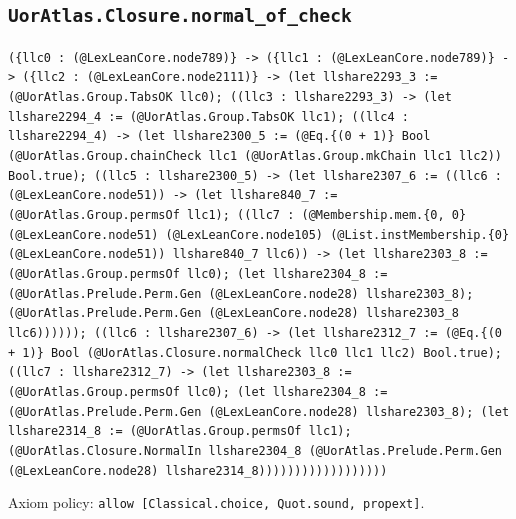 \documentclass[11pt]{article}
\begin{document}
\subsection*{\texttt{UorAtlas.Closure.normal\_of\_check}}
\noindent\texttt{(\{llc0 : (@LexLeanCore.node789)\} -> (\{llc1 : (@LexLeanCore.node789)\} -> (\{llc2 : (@LexLeanCore.node2111)\} -> (let llshare2293\_3 := (@UorAtlas.Group.TabsOK llc0); ((llc3 : llshare2293\_3) -> (let llshare2294\_4 := (@UorAtlas.Group.TabsOK llc1); ((llc4 : llshare2294\_4) -> (let llshare2300\_5 := (@Eq.\{(0 + 1)\} Bool (@UorAtlas.Group.chainCheck llc1 (@UorAtlas.Group.mkChain llc1 llc2)) Bool.true); ((llc5 : llshare2300\_5) -> (let llshare2307\_6 := ((llc6 : (@LexLeanCore.node51)) -> (let llshare840\_7 := (@UorAtlas.Group.permsOf llc1); ((llc7 : (@Membership.mem.\{0, 0\} (@LexLeanCore.node51) (@LexLeanCore.node105) (@List.instMembership.\{0\} (@LexLeanCore.node51)) llshare840\_7 llc6)) -> (let llshare2303\_8 := (@UorAtlas.Group.permsOf llc0); (let llshare2304\_8 := (@UorAtlas.Prelude.Perm.Gen (@LexLeanCore.node28) llshare2303\_8); (@UorAtlas.Prelude.Perm.Gen (@LexLeanCore.node28) llshare2303\_8 llc6)))))); ((llc6 : llshare2307\_6) -> (let llshare2312\_7 := (@Eq.\{(0 + 1)\} Bool (@UorAtlas.Closure.normalCheck llc0 llc1 llc2) Bool.true); ((llc7 : llshare2312\_7) -> (let llshare2303\_8 := (@UorAtlas.Group.permsOf llc0); (let llshare2304\_8 := (@UorAtlas.Prelude.Perm.Gen (@LexLeanCore.node28) llshare2303\_8); (let llshare2314\_8 := (@UorAtlas.Group.permsOf llc1); (@UorAtlas.Closure.NormalIn llshare2304\_8 (@UorAtlas.Prelude.Perm.Gen (@LexLeanCore.node28) llshare2314\_8))))))))))))))))))}\par
\noindent Axiom policy: \texttt{allow [Classical.choice, Quot.sound, propext]}.\par
\end{document}
